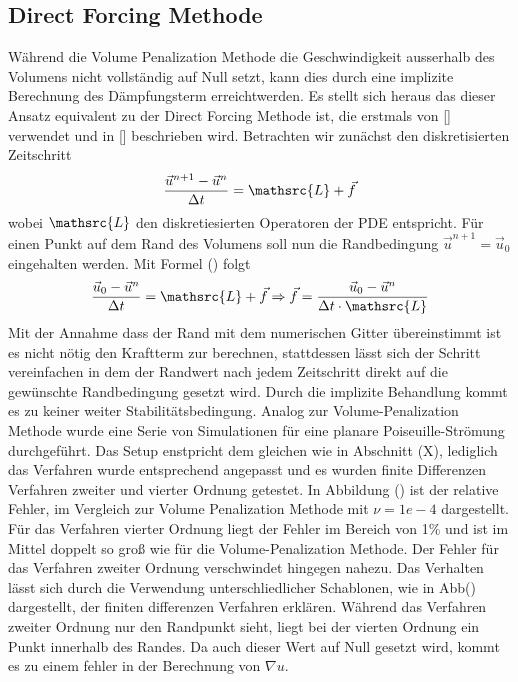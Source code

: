 \subsection{Direct Forcing Methode}
Während die Volume Penalization Methode die Geschwindigkeit ausserhalb des Volumens nicht vollständig auf Null setzt,
 kann dies durch eine implizite Berechnung des Dämpfungsterm erreichtwerden. Es stellt sich heraus das dieser Ansatz equivalent
  zu der Direct Forcing Methode ist, die erstmals von [] verwendet und in [] beschrieben wird.
Betrachten wir zunächst den diskretisierten Zeitschritt
\begin{align}
    \frac{\vec{u}^{n+1} -\vec{u}^n}{\Delta t} = \mathsrc{L} + \vec{f}\\
\end{align}
wobei $\mathsrc{L}$ den diskretiesierten Operatoren der PDE entspricht.
Für einen Punkt auf dem Rand des Volumens soll nun die Randbedingung $\vec{u}^{n+1} = \vec{u}_0$ eingehalten werden.
Mit Formel () folgt
\begin{align}
    \frac{\vec{u}_0 -\vec{u}^n}{\Delta t} = \mathsrc{L} + \vec{f} \Rightarrow \vec{f} = \frac{\vec{u}_0 -\vec{u}^n}{\Delta t\cdot \mathsrc{L}}\\
\end{align}
Mit der Annahme dass der Rand mit dem numerischen Gitter übereinstimmt ist es nicht nötig den Kraftterm zur berechnen, stattdessen lässt sich der
Schritt vereinfachen in dem der Randwert nach  jedem Zeitschritt direkt auf die gewünschte Randbedingung gesetzt wird. Durch die
implizite Behandlung kommt es zu keiner weiter Stabilitätsbedingung.
Analog zur Volume-Penalization Methode wurde eine Serie von Simulationen für eine planare Poiseuille-Strömung durchgeführt.
Das Setup enstpricht dem gleichen wie in Abschnitt (X), lediglich das Verfahren wurde entsprechend angepasst und es wurden finite Differenzen Verfahren zweiter und
vierter Ordnung getestet.
In Abbildung () ist der relative Fehler, im Vergleich zur Volume Penalization  Methode mit $\nu=1e-4$ dargestellt.
Für das Verfahren vierter Ordnung liegt der Fehler im Bereich von 1\% und ist im Mittel doppelt so groß wie für die Volume-Penalization Methode.
Der Fehler für das Verfahren zweiter Ordnung verschwindet hingegen nahezu.
Das Verhalten lässt sich durch die Verwendung unterschliedlicher Schablonen, wie in Abb() dargestellt,  der finiten differenzen Verfahren erklären.
Während das Verfahren zweiter Ordnung nur den Randpunkt sieht, liegt bei der vierten Ordnung ein Punkt innerhalb des Randes.
Da auch dieser Wert auf Null gesetzt wird, kommt es zu einem fehler in der Berechnung von $\nabla u$.

